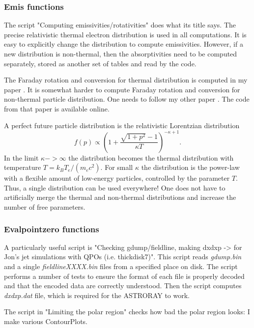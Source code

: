\documentclass{emulateapj}
\begin{document}
\subsubsection{Emis functions}
The script "Computing emissivities/rotativities" does what its title says. The precise relativistic thermal electron distribution is used in all computations.
It is easy to explicitly change the distribution to compute emissivities. However, if a new distribution is non-thermal,
then the absorptivities need to be computed separately, stored as another set of tables and read by the code.

The Faraday rotation and conversion for thermal distribution is computed in my paper \citep{Shcherbakov:2008fa}.
It is somewhat harder to compute Faraday rotation and conversion for non-thermal particle distribution.
One needs to follow my other paper \citet{Huang:2011de}. The code from that paper is available online.

A perfect future particle distribution is the relativistic Lorentzian distribution \citep{Shcherbakov:2009po}
\begin{equation}
f(p)\propto\left(1+\frac{\sqrt{1+p^2}-1}{\kappa T}\right)^{-\kappa+1}.
\end{equation} In the limit $\kappa->\infty$ the distribution becomes the thermal distribution with temperature $T=k_B T_e/(m_e c^2)$.
For small $\kappa$ the distribution is the power-law with a flexible amount of low-energy particles, controlled by the parameter $T$.
Thus, a single distribution can be used everywhere! One does not have to artificially merge the thermal and non-thermal distributions and increase the number of free parameters.

\subsubsection{Evalpointzero functions}
A particularly useful script is "Checking gdump/fieldline, making dxdxp -> for Jon's jet simulations with QPOs (i.e. thickdisk7)". This script reads \textit{gdump.bin} and a single \textit{fieldlineXXXX.bin} files from a specified place on disk.
The script performs a number of tests to ensure the format of each file is properly decoded and that the encoded data are correctly understood.
Then the script computes \textit{dxdxp.dat} file, which is required for the ASTRORAY to work.

The script in "Limiting the polar region" checks how bad the polar region looks: I make various ContourPlots.





\end{document}
